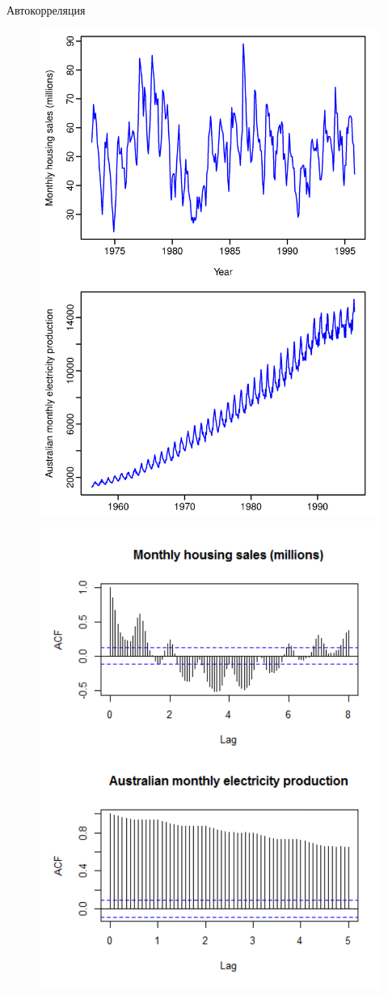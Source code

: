 \begin{frame}{Автокорреляция}
\begin{figure}
    \centering
    \includegraphics[width=0.45\linewidth]{lecture_2/fig/ts_components_1.png}
    \includegraphics[width=0.53\linewidth]{lecture_2/fig/4acf_1.png}
\end{figure}
\end{frame}
